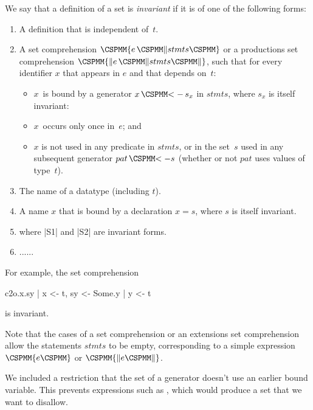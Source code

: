 \begin{definition}
\label{def:invariant}
We say that a definition of a set is \emph{invariant} if it is of one of the
following forms:
%
\begin{enumerate}
\item A definition that is independent of~$t$.

\item A set comprehension $\M\{ e \,\M\| stmts \M\}$ or a productions set
comprehension $\M{\{\|} e \,\M\| stmts \M{\|\}}$, such that for every identifier
$x$ that appears in $e$ and that depends on~$t$:
  \begin{itemize}
  \item $x$~is bound by a generator $x \,\M{<-}\, s_x$ in $stmts$, where $s_x$ is
  itself invariant: 
  \item $x$~occurs only once in~$e$; and
  \item $x$ is not used in any predicate in $stmts$, or in the set~$s$ used in
  any subsequent generator $pat \,\M{<-} s$ (whether or not $pat$ uses values of
  type~$t$). 
  \end{itemize}

\item The name of a datatype (including $t$). 

\item A name $x$ that is bound by a declaration $x = s$, where $s$ is itself
invariant. 

\item {} where |S1| and |S2| are invariant forms. 

\item ......
\end{enumerate}
\end{definition}

For example, the set comprehension 
\begin{cspm}
{ c2o.x.sy | x <- t, sy <- {Some.y | y <- t} }
\end{cspm}
is invariant.

Note that the cases of a set comprehension or an extensions set comprehension
allow the statements $stmts$ to be empty, corresponding to a simple expression
$\M\{ e \M\}$ or $\M{\{\|} e \M{\|\}}$.

We included a restriction that the set of a generator doesn't use an earlier
bound variable.  This prevents expressions such as
, which would produce a set that we
want to disallow.

